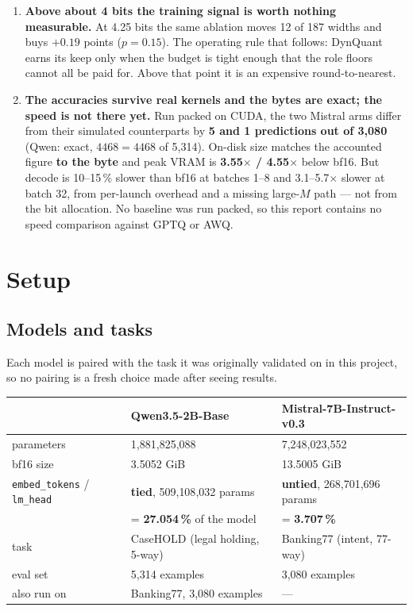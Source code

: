 \documentclass[11pt]{article}
\newcommand{\x}{\texorpdfstring{$\times$}{x}}
\newcommand{\pct}{\,\%}
\newcommand{\code}[1]{\texttt{#1}}
\begin{document}
\begin{enumerate}[leftmargin=1.4em]
\item \textbf{Above about 4 bits the training signal is worth nothing measurable.} At 4.25 bits
the same ablation moves 12 of 187 widths and buys $+0.19$ points ($p = 0.15$). The operating
rule that follows: DynQuant earns its keep only when the budget is tight enough that the role
floors cannot all be paid for. Above that point it is an expensive round-to-nearest.

\item \textbf{The accuracies survive real kernels and the bytes are exact; the speed is not
there yet.} Run packed on CUDA, the two Mistral arms differ from their simulated counterparts by
\textbf{5 and 1 predictions out of 3{,}080} (Qwen: exact, $4468 = 4468$ of 5{,}314). On-disk
size matches the accounted figure \textbf{to the byte} and peak VRAM is \textbf{3.55\x{} /
4.55\x} below bf16. But decode is 10--15\pct{} slower than bf16 at batches 1--8 and 3.1--5.7\x{}
slower at batch 32, from per-launch overhead and a missing large-$M$ path --- not from the bit
allocation. No baseline was run packed, so this report contains no speed comparison against
GPTQ or AWQ.
\end{enumerate}

\section{Setup}

\subsection{Models and tasks}

Each model is paired with the task it was originally validated on in this project, so no pairing
is a fresh choice made after seeing results.

\begin{center}\small
\begin{tabular}{@{}lll@{}}
\toprule
 & \textbf{Qwen3.5-2B-Base} & \textbf{Mistral-7B-Instruct-v0.3} \\
\midrule
parameters & 1{,}881{,}825{,}088 & 7{,}248{,}023{,}552 \\
bf16 size & 3.5052 GiB & 13.5005 GiB \\
\code{embed\_tokens} / \code{lm\_head} & \textbf{tied}, 509{,}108{,}032 params & \textbf{untied}, 268{,}701{,}696 params \\
 & \quad = \textbf{27.054\pct} of the model & \quad = \textbf{3.707\pct} \\
task & CaseHOLD (legal holding, 5-way) & Banking77 (intent, 77-way) \\
eval set & 5{,}314 examples & 3{,}080 examples \\
also run on & Banking77, 3{,}080 examples & --- \\
\bottomrule
\end{tabular}
\end{center}
\end{document}

